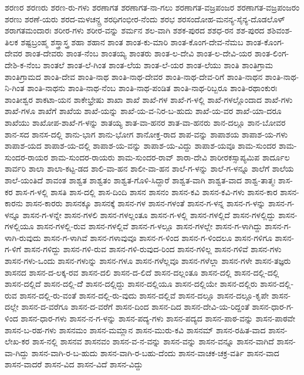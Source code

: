 ಶರಣರ
ಶರಣರು
ಶರಣ-ರು-ಗಳು
ಶರಣಾಗತ
ಶರಣಾಗತ-ನಾ-ಗಲು
ಶರಣಾಗತ-ವಜ್ರಪಂಜರ
ಶರಣಾಗತ-ವಜ್ರಪಂಜರಂ
ಶರಣು
ಶರಣೆ-ಯರು
ಶರದ-ಮಳಚನ್ದ್ರ
ಶರಧಿಗಂಭೀರ-ನೆಂದು
ಶರಭ
ಶರಸಂದೋಹ-ಮನನ್ಯ-ಸೈನ್ಯ-ದೊಡಲೊಳ್
ಶರಾಗತಮಂದಾರಃ
ಶರೀರ-ಗಳು
ಶರೀರ-ವನ್ನು
ಶರ್ಮನ
ಶಲ-ವಾಗಿ
ಶಶಕ-ಪುರದ
ಶಶಧ-ರನ
ಶಶ-ಪುರದ
ಶಶಿವಂಶ-ತಿಲಕ
ಶಷ್ಟಬ್ರಂಹ್ಮ
ಶಸ್ತ್ರಾಸ್ತ್ರ
ಶಹಾ
ಶಹಾನ
ಶಾಂತ
ಶಾಂತ-ಕು-ಮಾರಿ
ಶಾಂತ-ಕೊಂಗ-ದೇವ-ನೆಮಬ
ಶಾಂತ-ಕೊಂಗ-ದೇವರ
ಶಾಂತ-ದೇವರು
ಶಾಂತ-ನೆಂಬ
ಶಾಂತಯ್ಯ
ಶಾಂತರು
ಶಾಂತ-ಲ-ದೇವಿ
ಶಾಂತ-ಲ-ದೇವಿ-ಯರ
ಶಾಂತ-ಲಿಂಗ-ದೇಶಿ-ಕ-ನೆಂಬ
ಶಾಂತಲೆ
ಶಾಂತ-ಲೆ-ಗಿಂತ
ಶಾಂತ-ಲೆಯ
ಶಾಂತ-ಲೆ-ಯರ
ಶಾಂತ-ಲೆಯು
ಶಾಂತಿ
ಶಾಂತಿಗ್ರಾಮ
ಶಾಂತಿಗ್ರಾಮದ
ಶಾಂತಿ-ದೇವ
ಶಾಂತಿ-ನಾಥ
ಶಾಂತಿ-ನಾಥ-ದೇವರ
ಶಾಂತಿ-ನಾಥ-ದೇವ-ರಿಗೆ
ಶಾಂತಿ-ನಾಥನ
ಶಾಂತಿ-ನಾಥ-ನಿ-ಗಿಂತ
ಶಾಂತಿ-ನಾಥನು
ಶಾಂತಿ-ನಾಥ-ನೆಂಬ
ಶಾಂತಿ-ನಾಥ-ಪಂಡಿತ
ಶಾಂತಿ-ನಾಥ-ರಿಬ್ಬರೂ
ಶಾಂತಿ-ರಥಾಂಕುರಃ
ಶಾಂತೀಶ್ವರ
ಶಾಕಟಾ-ಯನ
ಶಾಕೇಭ್ರೇಷು
ಶಾಖಾ
ಶಾಖೆ
ಶಾಖೆ-ಗಳ
ಶಾಖೆ-ಗ-ಳಲ್ಲಿ
ಶಾಖೆ-ಗಳಲ್ಲೊಂದಾದ
ಶಾಖೆ-ಗಳು
ಶಾಖೆ-ಗಳೂ
ಶಾಖೆಗೆ
ಶಾಖೆಯ
ಶಾಖೆ-ಯನ್ನು
ಶಾಖೆ-ಯ-ವ-ನಿರ-ಬ-ಹುದು
ಶಾಖೆ-ಯ-ವರ
ಶಾಖೆ-ಯಾ-ದರೂ
ಶಾಖೆಯು
ಶಾಖೋಪ-ಶಾಖೆ-ಗ-ಳನ್ನು
ಶಾತಯ್ಯ
ಶಾತ-ವಾ-ಹನರ
ಶಾತ-ವಾ-ಹನರು
ಶಾನ-ದಲ್ಲೂ
ಶಾನ-ಬೋವರ
ಶಾನ-ಸದ
ಶಾನಸ-ದಲ್ಲಿ
ಶಾನು-ಭಾಗ
ಶಾನು-ಭೋಗ
ಶಾನೋಕ್ತ-ರಾದ
ಶಾಪ-ವನ್ನು
ಶಾಪಾಶಯ
ಶಾಪಾಶ-ಯ-ಗಳು
ಶಾಪಾಶ-ಯದ
ಶಾಪಾಶ-ಯ-ದಲ್ಲಿ
ಶಾಪಾಶ-ಯ-ವನ್ನು
ಶಾಪಾಶ-ಯ-ವಿದ್ದು
ಶಾಪಾಶ-ಯವೂ
ಶಾಮ-ಸುಂದರ
ಶಾಮ-ಸುಂದರ-ರಾಯರ
ಶಾಮ-ಸುಂದರ-ರಾಯರು
ಶಾಮ-ಸುಂದರ-ರಾವ್
ಶಾರಾ-ದೇವಿ
ಶಾರೀರಕಸ್ಸಾಪ್ಯಮಿಪ
ಶಾರ್ದೂಲ
ಶಾರ್ವರಿ
ಶಾಲಾ
ಶಾಲಾ-ಕಟ್ಟ-ಡದ
ಶಾಲಿ-ವಾ-ಹನ
ಶಾಲೀ-ವಾ-ಹನ
ಶಾಲೆ-ಗ-ಳನ್ನು
ಶಾಲೆ-ಗ-ಳನ್ನೂ
ಶಾಲೆಗೆ
ಶಾಲೆಯ
ಶಾಲೆ-ಯಂತಿದೆ
ಶಾವಂತ
ಶಾಶ್ವತ
ಶಾಶ್ವತಂ
ಶಾಶ್ವತ-ಗೊಳಿ-ಸಿದ್ದಾರೆ
ಶಾಶ್ವತ-ವಾಗಿ
ಶಾಶ್ವತ-ವಾದ
ಶಾಶ್ವ-ತಾತ್ಮಃ
ಶಾಸ-ಕರ
ಶಾಸ-ಗ-ಳಲ್ಲಿ
ಶಾಸತಿ
ಶಾಸ-ದಲ್ಲಿ
ಶಾಸ-ದಿಂದಿ
ಶಾಸನ
ಶಾಸನಂ
ಶಾಸನ-ಕವಿ
ಶಾಸನ-ಕವಿ-ಗಳು
ಶಾಸನ-ಕಾರ
ಶಾಸನ-ಕಾರನು
ಶಾಸನ-ಕಾರರು
ಶಾಸನಕ್ಕೂ
ಶಾಸನಕ್ಕೆ
ಶಾಸನ-ಗಳ
ಶಾಸನ-ಗಳಂತೆ
ಶಾಸನ-ಗ-ಳನ್ನ
ಶಾಸನ-ಗ-ಳನ್ನು
ಶಾಸನ-ಗ-ಳನ್ನೂ
ಶಾಸನ-ಗ-ಳನ್ನೇ
ಶಾಸನ-ಗಳಲಿ
ಶಾಸನ-ಗಳಲ್ಲಂತೂ
ಶಾಸನ-ಗ-ಳಲ್ಲಿ
ಶಾಸನ-ಗಳಲ್ಲಿದೆ
ಶಾಸನ-ಗಳಲ್ಲಿದ್ದು
ಶಾಸನ-ಗಳಲ್ಲಿಯೂ
ಶಾಸನ-ಗಳಲ್ಲಿ-ರುವ
ಶಾಸನ-ಗಳಲ್ಲಿವೆ
ಶಾಸನ-ಗ-ಳಲ್ಲೂ
ಶಾಸನ-ಗಳಲ್ಲೇ
ಶಾಸನ-ಗ-ಳಾಗಿದ್ದು
ಶಾಸನ-ಗ-ಳಾಗಿ-ರುವುದು
ಶಾಸನ-ಗ-ಳಾಗಿವೆ
ಶಾಸನ-ಗಳಾವುವೂ
ಶಾಸನ-ಗ-ಳಿಂದ
ಶಾಸನ-ಗ-ಳಿಂದಲೂ
ಶಾಸನ-ಗಳಿಗೂ
ಶಾಸನ-ಗ-ಳಿಗೆ
ಶಾಸನ-ಗಳಿದ್ದು
ಶಾಸನ-ಗಳಿ-ರುವ
ಶಾಸನ-ಗಳಿ-ರುವುದ-ರಿಂದ
ಶಾಸನ-ಗಳಿಲ್ಲ
ಶಾಸನ-ಗಳಿವೆ
ಶಾಸನ-ಗಳು
ಶಾಸನ-ಗಳು-ಒಂದು
ಶಾಸನ-ಗಳುನ್ನು
ಶಾಸನ-ಗಳೂ
ಶಾಸನ-ಗಳೆಲ್ಲವೂ
ಶಾಸನ-ಗಳೆಲ್ಲಾ
ಶಾಸನ-ಗಳೇ
ಶಾಸನ-ತಜ್ಞರು
ಶಾಸನದ
ಶಾಸನ-ದ-ಲಕ್ಕ-ರವ
ಶಾಸನ-ದಲಿ
ಶಾಸನ-ದ-ಲಿದೆ
ಶಾಸನ-ದಲ್ಲಂತೂ
ಶಾಸನ-ದಲ್ಲಿ
ಶಾಸನ-ದಲ್ಲಿ-ದಲ್ಲಿ
ಶಾಸನ-ದಲ್ಲಿದೆ
ಶಾಸನ-ದಲ್ಲಿ-ದೆೆ
ಶಾಸನ-ದಲ್ಲಿದ್ದು
ಶಾಸನ-ದಲ್ಲಿಯೂ
ಶಾಸನ-ದಲ್ಲಿಯೇ
ಶಾಸನ-ದಲ್ಲಿರು
ಶಾಸನ-ದಲ್ಲಿ-ರುವ
ಶಾಸನ-ದಲ್ಲಿ-ರು-ವಂತೆ
ಶಾಸನ-ದಲ್ಲಿ-ರು-ವುದು
ಶಾಸನ-ದಲ್ಲಿವೆ
ಶಾಸನ-ದಲ್ಲೂ
ಶಾಸನ-ದಲ್ಲೂ-ಕೃಪೇ
ಶಾಸನ-ದಲ್ಲೇ
ಶಾಸನ-ದ-ವರೆಗೂ
ಶಾಸನ-ದ-ವರೆಗೆ
ಶಾಸನ-ದಿಂದ
ಶಾಸನ-ದಿದ
ಶಾಸನ-ದೇವಿ-ಯ-ರಿದ್ದಂತೆ
ಶಾಸನ-ಧಾರ-ಗ-ಳಿಂದ
ಶಾಸನ-ಧಾರ-ಗಳು
ಶಾಸನ-ನ-ಗ-ಳನ್ನು
ಶಾಸನ-ಪದ್ಯ-ಗಳು
ಶಾಸನ-ಪದ್ಯದ
ಶಾಸನ-ಪಾಠ-ವನ್ನು
ಶಾಸನ-ಪಾಠವೇ
ಶಾಸನ-ಬ-ರಹ-ಗಳು
ಶಾಸನಮಂ
ಶಾಸನ-ಮಮ್ಲಾನ
ಶಾಸನ-ಮುರು-ಕವಿ
ಶಾಸನಮ್
ಶಾಸನ-ರಹಿತ-ವಾದ
ಶಾಸನ-ಲೇಖ-ಕರ
ಶಾಸ-ನಲ್ಲಿ
ಶಾಸನವ
ಶಾಸನವಂ
ಶಾಸನ-ವ-ನ-ವನ್ನು
ಶಾಸನ-ವನ್ನು
ಶಾಸನ-ವನ್ನೂ
ಶಾಸನ-ವಾಗಿದೆ
ಶಾಸನ-ವಾ-ಗಿದ್ದು
ಶಾಸನ-ವಾಗಿ-ರ-ಬ-ಹುದು
ಶಾಸನ-ವಾಗಿ-ರ-ಬಹು-ದೆಂದು
ಶಾಸನ-ವಾಚಕ-ಚಕ್ರ-ವರ್ತಿ
ಶಾಸನ-ವಾದ
ಶಾಸನ-ವಾದರೆ
ಶಾಸನ-ವಿದ
ಶಾಸನ-ವಿದೆ
ಶಾಸನ-ವಿದ್ದು
